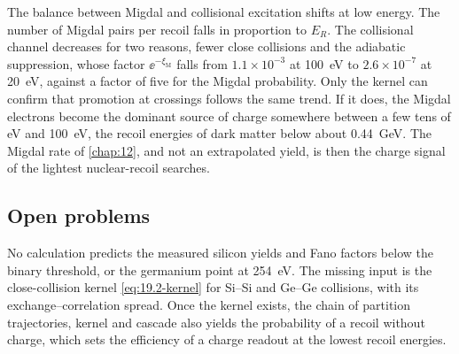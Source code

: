 The balance between Migdal and collisional excitation shifts at low energy. The number of Migdal pairs per recoil falls in proportion to $E_R$. The collisional channel decreases for two reasons, fewer close collisions and the adiabatic suppression, whose factor $\ee^{-\xi_{\mathrm{M}}}$ falls from $1.1\times10^{-3}$ at \SI{100}{eV} to $2.6\times10^{-7}$ at \SI{20}{eV}, against a factor of five for the Migdal probability. Only the kernel can confirm that promotion at crossings follows the same trend. If it does, the Migdal electrons become the dominant source of charge somewhere between a few tens of eV and \SI{100}{eV}, the recoil energies of dark matter below about \SI{0.44}{GeV}. The Migdal rate of \cref{chap:12}, and not an extrapolated yield, is then the charge signal of the lightest nuclear-recoil searches.

\subsection{Open problems}\label{sec:19.2-open}

No calculation predicts the measured silicon yields and Fano factors below the binary threshold, or the germanium point at \SI{254}{eV}. The missing input is the close-collision kernel \cref{eq:19.2-kernel} for Si--Si and Ge--Ge collisions, with its exchange--correlation spread. Once the kernel exists, the chain of partition trajectories, kernel and cascade also yields the probability of a recoil without charge, which sets the efficiency of a charge readout at the lowest recoil energies.
